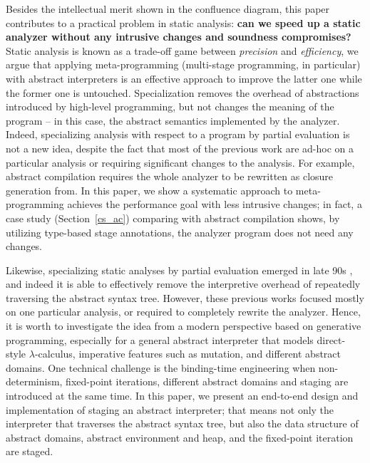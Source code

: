 Besides the intellectual merit shown in the confluence diagram, this paper
contributes to a practical problem in static analysis: \textbf{can we speed up a
static analyzer without any intrusive changes and soundness compromises?} Static
analysis is known as a trade-off game between \textit{precision} and
\textit{efficiency}, we argue that applying meta-programming (multi-stage
programming, in particular) with abstract interpreters is an effective approach
to improve the latter one while the former one is untouched. Specialization
removes the overhead of abstractions introduced by high-level programming, but
not changes the meaning of the program -- in this case, the abstract semantics
implemented by the analyzer. Indeed, specializing analysis with respect to a
program by partial evaluation \cite{damian1999partial, amtoft1999partial,
Boucher:1996:ACN:647473.727587, ashley:practical} is not a new idea, despite the
fact that most of the previous work are ad-hoc on a particular analysis or
requiring significant changes to the analysis. For example, abstract compilation
\cite{Boucher:1996:ACN:647473.727587} requires the whole analyzer to be
rewritten as closure generation from. In this paper, we show a systematic
approach to meta-programming achieves the performance goal with less intrusive
changes; in fact, a case study (Section~\ref{cs_ac}) comparing with abstract
compilation shows, by utilizing type-based stage annotations, the analyzer
program does not need any changes.


\iffalse
Likewise, specializing static analyses by partial evaluation emerged in late 90s
, and indeed it is able to effectively remove the interpretive
overhead of repeatedly traversing the abstract syntax tree. However, these
previous works focused mostly on one particular analysis, or required to
completely rewrite the analyzer. Hence, it is worth to investigate the idea from
a modern perspective based on generative programming, especially for a general
abstract interpreter that models direct-style $\lambda$-calculus, imperative
features such as mutation, and different abstract domains. One technical
challenge is the binding-time engineering when non-determinism, fixed-point
iterations, different abstract domains and staging are introduced at the same
time. In this paper, we present an end-to-end design and implementation of
staging an abstract interpreter; that means not only the interpreter that
traverses the abstract syntax tree, but also the data structure of abstract
domains, abstract environment and heap, and the fixed-point iteration are
staged.

